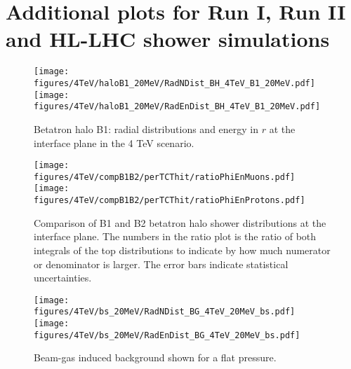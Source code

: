 \section{Additional plots for Run I, Run II and HL-LHC shower simulations\label{run1run2app}}


\begin{figure}[!htb]
\begin{center}

\texttt{[image: figures/4TeV/haloB1\_20MeV/RadNDist\_BH\_4TeV\_B1\_20MeV.pdf]}
\texttt{[image: figures/4TeV/haloB1\_20MeV/RadEnDist\_BH\_4TeV\_B1\_20MeV.pdf]}

\end{center}
\vspace{-0.6cm}
 \caption{Betatron halo B1: radial distributions and energy in $r$ at the interface plane in the 4 TeV scenario. 
  \label{dist4TeVB12}}
\end{figure}

\begin{figure}[!htb]
\begin{center}
\texttt{[image: figures/4TeV/compB1B2/perTCThit/ratioPhiEnMuons.pdf]}
\texttt{[image: figures/4TeV/compB1B2/perTCThit/ratioPhiEnProtons.pdf]}
\end{center}
\vspace{-0.6cm}
\caption{Comparison of B1 and B2 betatron halo shower distributions at the interface plane. The numbers in the ratio plot is the ratio of both integrals of the top distributions to indicate by how much numerator or denominator is larger. The error bars indicate statistical uncertainties.
  \label{comp4TeVB1B2}}
\end{figure}


\begin{figure}%
\begin{center}
\texttt{[image: figures/4TeV/bs\_20MeV/RadNDist\_BG\_4TeV\_20MeV\_bs.pdf]}
\texttt{[image: figures/4TeV/bs\_20MeV/RadEnDist\_BG\_4TeV\_20MeV\_bs.pdf]}
\end{center}
\vspace{-0.6cm}
 \caption{Beam-gas induced background shown for a flat pressure.
  \label{dist4TeVBGbs2}}
\end{figure}

